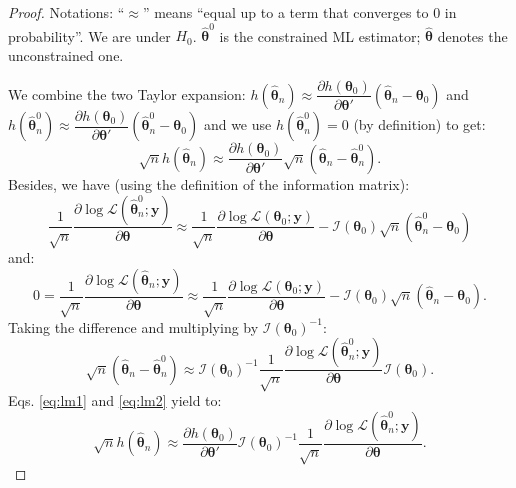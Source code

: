 \documentclass[
]{book}
\theoremstyle{definition}
\theoremstyle{definition}
\theoremstyle{definition}
\theoremstyle{definition}
\theoremstyle{remark}
\begin{document}
\begin{proof}
Notations: ``\(\approx\)'' means ``equal up to a term that converges to 0 in probability''. We are under \(H_0\). \(\hat{\boldsymbol\theta}^0\) is the constrained ML estimator; \(\hat{\boldsymbol\theta}\) denotes the unconstrained one.

We combine the two Taylor expansion: \(h(\hat{\boldsymbol\theta}_n) \approx \dfrac{\partial h(\boldsymbol\theta_0)}{\partial \boldsymbol\theta'}(\hat{\boldsymbol\theta}_n - \boldsymbol\theta_0)\) and \(h(\hat{\boldsymbol\theta}_n^0) \approx \dfrac{\partial h(\boldsymbol\theta_0)}{\partial \boldsymbol\theta'}(\hat{\boldsymbol\theta}_n^0 - \boldsymbol\theta_0)\) and we use \(h(\hat{\boldsymbol\theta}_n^0)=0\) (by definition) to get:
\begin{equation}
\sqrt{n}h(\hat{\boldsymbol\theta}_n) \approx \dfrac{\partial h(\boldsymbol\theta_0)}{\partial \boldsymbol\theta'}\sqrt{n}(\hat{\boldsymbol\theta}_n - \hat{\boldsymbol\theta}^0_n). \label{eq:lm1}
\end{equation}
Besides, we have (using the definition of the information matrix):
\begin{equation}
\frac{1}{\sqrt{n}}\frac{\partial \log \mathcal{L}(\hat{\boldsymbol\theta}^0_n;\mathbf{y})}{\partial \boldsymbol\theta} \approx
\frac{1}{\sqrt{n}}\frac{\partial \log \mathcal{L}(\boldsymbol\theta_0;\mathbf{y})}{\partial \boldsymbol\theta} - \mathcal{I}(\boldsymbol\theta_0)\sqrt{n}(\hat{\boldsymbol\theta}^0_n-\boldsymbol\theta_0) \label{eq:lm29}
\end{equation}
and:
\begin{equation}
0=\frac{1}{\sqrt{n}}\frac{\partial \log \mathcal{L}(\hat{\boldsymbol\theta}_n;\mathbf{y})}{\partial \boldsymbol\theta} \approx
\frac{1}{\sqrt{n}}\frac{\partial \log \mathcal{L}(\boldsymbol\theta_0;\mathbf{y})}{\partial \boldsymbol\theta} - \mathcal{I}(\boldsymbol\theta_0)\sqrt{n}(\hat{\boldsymbol\theta}_n-\boldsymbol\theta_0).\label{eq:lm30}
\end{equation}
Taking the difference and multiplying by \(\mathcal{I}(\boldsymbol\theta_0)^{-1}\):
\begin{equation}
\sqrt{n}(\hat{\boldsymbol\theta}_n-\hat{\boldsymbol\theta}_n^0) \approx
\mathcal{I}(\boldsymbol\theta_0)^{-1}\frac{1}{\sqrt{n}}\frac{\partial \log \mathcal{L}(\hat{\boldsymbol\theta}^0_n;\mathbf{y})}{\partial \boldsymbol\theta}
\mathcal{I}(\boldsymbol\theta_0).\label{eq:lm2}
\end{equation}
Eqs. \eqref{eq:lm1} and \eqref{eq:lm2} yield to:
\begin{equation}
\sqrt{n}h(\hat{\boldsymbol\theta}_n) \approx \dfrac{\partial h(\boldsymbol\theta_0)}{\partial \boldsymbol\theta'} \mathcal{I}(\boldsymbol\theta_0)^{-1}\frac{1}{\sqrt{n}}\frac{\partial \log \mathcal{L}(\hat{\boldsymbol\theta}^0_n;\mathbf{y})}{\partial \boldsymbol\theta}.\label{eq:lm3}
\end{equation}


\end{proof}
\end{document}
